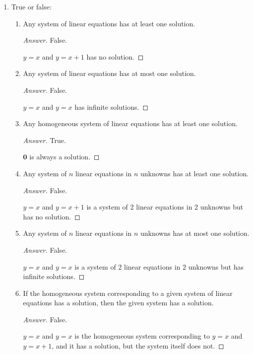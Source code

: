 \documentclass[../psets.tex]{subfiles}
\begin{document}
\begin{enumerate}[label={\textbf{6.\arabic*.}}]
    \item True or false:
    \begin{enumerate}
        \item Any system of linear equations has at least one solution.
        \begin{proof}[Answer]
            False.\par
            $y=x$ and $y=x+1$ has no solution.
        \end{proof}
        \item Any system of linear equations has at most one solution.
        \begin{proof}[Answer]
            False.\par
            $y=x$ and $y=x$ has infinite solutions.
        \end{proof}
        \item Any homogeneous system of linear equations has at least one solution.
        \begin{proof}[Answer]
            True.\par
            $\bm{0}$ is always a solution.
        \end{proof}
        \item Any system of $n$ linear equations in $n$ unknowns has at least one solution.
        \begin{proof}[Answer]
            False.\par
            $y=x$ and $y=x+1$ is a system of 2 linear equations in 2 unknowns but has no solution.
        \end{proof}
        \item Any system of $n$ linear equations in $n$ unknowns has at most one solution.
        \begin{proof}[Answer]
            False.\par
            $y=x$ and $y=x$ is a system of 2 linear equations in 2 unknowns but has infinite solutions.
        \end{proof}
        \item If the homogeneous system corresponding to a given system of linear equations has a solution, then the given system has a solution.
        \begin{proof}[Answer]
            False.\par
            $y=x$ and $y=x$ is the homogeneous system corresponding to $y=x$ and $y=x+1$, and it has a solution, but the system itself does not.
        \end{proof}

\end{enumerate}
\end{enumerate}
\end{document}
